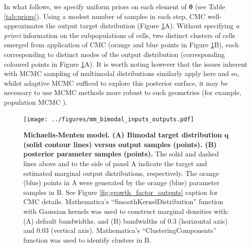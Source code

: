 %
In what follows, we specify uniform priors on each element of $\boldsymbol{\theta}$ (see Table \ref{tab:priors}). Using a modest number of samples in each step, CMC well-approximates the output target distribution (Figure \ref{fig:mm_bimodal_inputs_outputs}A). Without specifying \textit{a priori} information on the subpopulations of cells, two distinct clusters of cells emerged from application of CMC (orange and blue points in Figure \ref{fig:mm_bimodal_inputs_outputs}B), each corresponding to distinct modes of the output distribution (corresponding coloured points in Figure \ref{fig:mm_bimodal_inputs_outputs}A). It is worth noting however that the issues inherent with MCMC sampling of multimodal distributions similarly apply here and so, whilst adaptive MCMC \cite{johnstone2016uncertainty} sufficed to explore this posterior surface, it may be necessary to use MCMC methods more robust to such geometries (for example, population MCMC \cite{jasra2007population}).

\begin{figure}[H]
\centerline{\texttt{[image: ../figures/mm\_bimodal\_inputs\_outputs.pdf]}}
\caption{\textbf{Michaelis-Menten model. (A) Bimodal target distribution $\boldsymbol{q}$ (solid contour lines) versus output samples (points). (B) posterior parameter samples (points).} The solid and dashed lines above and to the side of panel A indicate the target and estimated marginal output distributions, respectively. The orange (blue) points in A were generated by the orange (blue) parameter samples in B. See Figure \ref{fig:growth_factor_outputs} caption for CMC details. Mathematica's ``SmoothKernelDistribution'' function \cite{mathematica} with Gaussian kernels was used to construct marginal densities with: (A) default bandwidths, and (B) bandwidths of 0.3 (horizontal axis) and 0.03 (vertical axis). Mathematica's ``ClusteringComponents'' function \cite{mathematica} was used to identify clusters
in B.}
\label{fig:mm_bimodal_inputs_outputs}
\end{figure}

